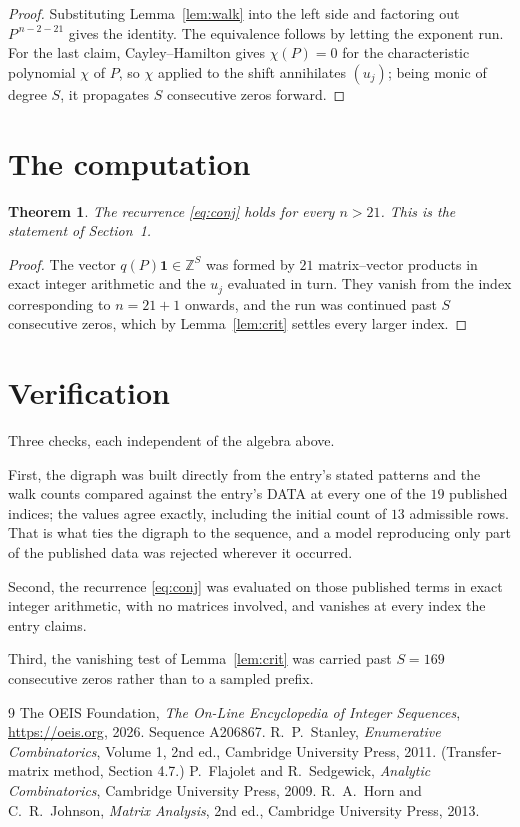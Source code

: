 \documentclass[11pt,a4paper]{article}
\theoremstyle{plain}
\newtheorem{theorem}{Theorem}
\theoremstyle{definition}
\begin{document}
\begin{proof}
Substituting Lemma~\ref{lem:walk} into the left side and factoring out
$P^{\,n-2-21}$ gives the identity. The equivalence follows by letting the exponent
run. For the last claim, Cayley--Hamilton gives $\chi(P)=0$ for the characteristic
polynomial $\chi$ of $P$, so $\chi$ applied to the shift annihilates $(u_j)$; being monic of
degree $S$, it propagates $S$ consecutive zeros forward.
\end{proof}

\section{The computation}

\begin{theorem}
The recurrence \eqref{eq:conj} holds for every $n>21$. This is the statement of
Section~1.
\end{theorem}

\begin{proof}
The vector $q(P)\mathbf{1}\in\mathbb{Z}^{S}$ was formed by $21$ matrix--vector
products in exact integer arithmetic and the $u_j$ evaluated in turn. They vanish from the
index corresponding to $n=21+1$ onwards, and the run was continued past $S$ consecutive
zeros, which by Lemma~\ref{lem:crit} settles every larger index.
\end{proof}

\section{Verification}

Three checks, each independent of the algebra above.

First, the digraph was built directly from the entry's stated patterns and the walk counts
compared against the entry's DATA at every one of the $19$ published indices; the
values agree exactly, including the initial count of $13$ admissible rows. That is
what ties the digraph to the sequence, and a model reproducing only part of the published
data was rejected wherever it occurred.

Second, the recurrence \eqref{eq:conj} was evaluated on those published terms in exact
integer arithmetic, with no matrices involved, and vanishes at every index the entry claims.

Third, the vanishing test of Lemma~\ref{lem:crit} was carried past $S=169$ consecutive
zeros rather than to a sampled prefix.

\begin{thebibliography}{9}
 The OEIS Foundation, \emph{The On-Line Encyclopedia of Integer
Sequences}, \url{https://oeis.org}, 2026. Sequence A206867.
 R.~P.~Stanley, \emph{Enumerative Combinatorics}, Volume 1, 2nd ed.,
Cambridge University Press, 2011. (Transfer-matrix method, Section 4.7.)
 P.~Flajolet and R.~Sedgewick, \emph{Analytic Combinatorics}, Cambridge
University Press, 2009.
 R.~A.~Horn and C.~R.~Johnson, \emph{Matrix Analysis}, 2nd ed., Cambridge
University Press, 2013.
\end{thebibliography}
\end{document}
